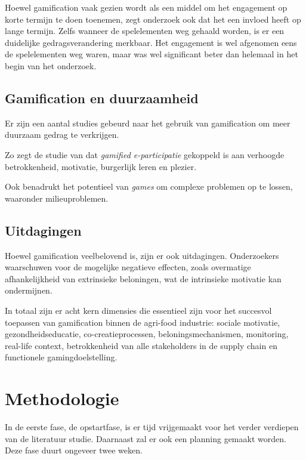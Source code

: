 \documentclass{hogent-article}
\begin{document}
Hoewel gamification vaak gezien wordt als een middel om het engagement op korte termijn te doen toenemen, zegt onderzoek ook dat het een invloed heeft op lange termijn. Zelfs wanneer de spelelementen weg gehaald worden, is er een duidelijke gedragsverandering merkbaar. Het engagement is wel afgenomen eens de spelelementen weg waren, maar was wel significant beter dan helemaal in het begin van het onderzoek. \autocite{Li_2024}

\subsection{Gamification en duurzaamheid}
Er zijn een aantal studies gebeurd naar het gebruik van gamification om meer duurzaam gedrag te verkrijgen. 

Zo zegt de studie van \textcite{Hassan_2020} dat \textit{gamified e-participatie} gekoppeld is aan verhoogde betrokkenheid, motivatie, burgerlijk leren en plezier.

Ook \textcite{McConigal2011} benadrukt het potentieel van \emph{games} om complexe problemen op te lossen, waaronder milieuproblemen.

\subsection{Uitdagingen}
Hoewel gamification veelbelovend is, zijn er ook uitdagingen. Onderzoekers waarschuwen voor de mogelijke negatieve effecten, zoals overmatige afhankelijkheid van extrinsieke beloningen, wat de intrinsieke motivatie kan ondermijnen. \autocite{Buznea2021}

In totaal zijn er acht kern dimensies die essentieel zijn voor het succesvol toepassen van gamification binnen de agri-food industrie: sociale motivatie, gezondheidseducatie, co-creatieprocessen, beloningsmechanismen, monitoring, real-life context, betrokkenheid van alle stakeholders in de supply chain en functionele gamingdoelstelling.\autocite{Latino_2023}


\section{Methodologie}%
\label{sec:methodologie}

In de eerste fase, de opstartfase, is er tijd vrijgemaakt voor het verder verdiepen van de literatuur studie. Daarnaast zal er ook een planning gemaakt worden. Deze fase duurt ongeveer twee weken.
\end{document}
